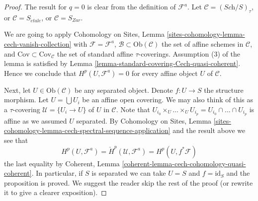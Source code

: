 \begin{proof}
The result for $q = 0$ is clear from the definition of $\mathcal{F}^a$.
Let $\mathcal{C} = (\textit{Sch}/S)_\tau$, or $\mathcal{C} = S_{\acute{e}tale}$,
or $\mathcal{C} = S_{Zar}$.

\medskip\noindent
We are going to apply
Cohomology on Sites,
Lemma \ref{sites-cohomology-lemma-cech-vanish-collection}
with $\mathcal{F} = \mathcal{F}^a$,
$\mathcal{B} \subset \text{Ob}(\mathcal{C})$ the set of affine schemes
in $\mathcal{C}$, and $\text{Cov} \subset \text{Cov}_{\mathcal{C}}$ the
set of standard affine $\tau$-coverings. Assumption (3) of
the lemma is satisfied by
Lemma \ref{lemma-standard-covering-Cech-quasi-coherent}.
Hence we conclude that $H^p(U, \mathcal{F}^a) = 0$ for every
affine object $U$ of $\mathcal{C}$.

\medskip\noindent
Next, let $U \in \text{Ob}(\mathcal{C})$ be any separated object.
Denote $f : U \to S$ the structure morphism.
Let $U = \bigcup U_i$ be an affine open covering.
We may also think of this as a $\tau$-covering
$\mathcal{U} = \{U_i \to U\}$ of $U$ in $\mathcal{C}$.
Note that
$U_{i_0} \times_U \ldots \times_U U_{i_p} = 
U_{i_0} \cap \ldots \cap U_{i_p}$ is affine as we assumed $U$ separated.
By
Cohomology on Sites, Lemma
\ref{sites-cohomology-lemma-cech-spectral-sequence-application}
and the result above we see that
$$
H^p(U, \mathcal{F}^a) = \check{H}^p(\mathcal{U}, \mathcal{F}^a)
= H^p(U, f^*\mathcal{F})
$$
the last equality by
Coherent, Lemma
\ref{coherent-lemma-cech-cohomology-quasi-coherent}.
In particular, if $S$ is separated we can take $U = S$ and
$f = \text{id}_S$ and the proposition is proved.
We suggest the reader skip the rest of the proof (or rewrite it
to give a clearer exposition).


\end{proof}
